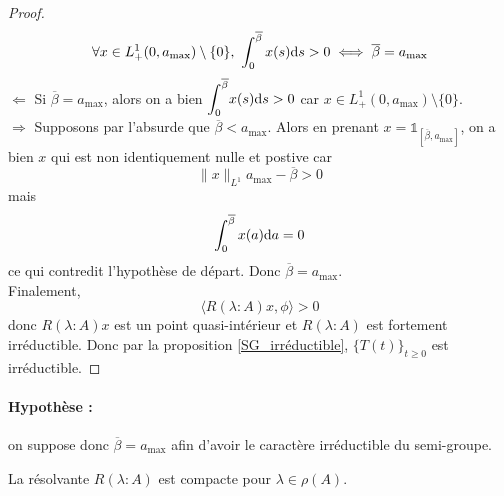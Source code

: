 \begin{proof}
    \begin{equation*}
        \forall x \in L^1_+(0,a_{\max}) \setminus \{0\}, \ \int_0^{\overline{\beta}}x(s)\mathrm{d} s >0 \iff \overline{\beta} = a_{\max}
    \end{equation*}
    $\boxed{\Longleftarrow}$ Si $\overline{\beta}=a_{\max}$, alors on a bien $\displaystyle{\int_0^{\overline{\beta}}}x(s)\mathrm{d} s >0$ car $x \in L^1_+(0,a_{\max}) \setminus \{0\}$. \\
    $\boxed{\Longrightarrow}$ Supposons par l'absurde que $\overline{\beta}<a_{\max}$. Alors en prenant $x = \mathds{1}_{[\overline{\beta},a_{\max}]}$, on a bien $x$ qui est non identiquement nulle et postive car 
    \begin{equation*}
        \|x\|_{L^1}a_{\max}-\overline{\beta} >0
    \end{equation*}
    mais 
    \begin{equation*}
        \int_0^{\overline{\beta}}x(a)\mathrm{d} a = 0
    \end{equation*}
    ce qui contredit l'hypothèse de départ. Donc $\overline{\beta}=a_{\max}$. \\
    Finalement, 
    \begin{equation*}
        \langle R(\lambda : A)x, \phi \rangle >0
    \end{equation*}
    donc $R(\lambda : A)x$ est un point quasi-intérieur et $R(\lambda : A)$ est fortement irréductible. Donc par la proposition \ref{SG_irréductible}, $\big\{T(t)\big\}_{t \geq 0}$ est irréductible.
\end{proof}

\paragraph{Hypothèse :} on suppose donc $\overline{\beta}=a_{\max}$ afin d'avoir le caractère irréductible du semi-groupe.

\begin{proposition}\label{prop_res_compacte}
    La résolvante $R(\lambda : A)$ est compacte pour $\lambda \in \rho(A)$.
\end{proposition}

